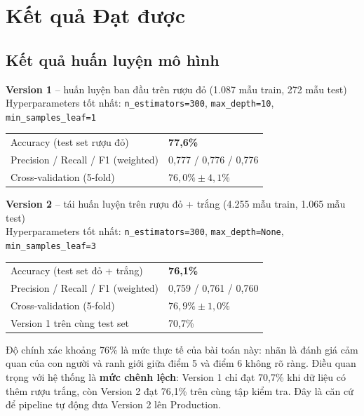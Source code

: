 \documentclass[12pt,a4paper]{report}
\begin{document}
\chapter{Kết quả Đạt được}

\section{Kết quả huấn luyện mô hình}

\begin{resultbox}
\textbf{Version 1} -- huấn luyện ban đầu trên rượu đỏ (1.087 mẫu train, 272 mẫu test)\\
Hyperparameters tốt nhất: \texttt{n\_estimators=300}, \texttt{max\_depth=10}, \texttt{min\_samples\_leaf=1}

\vspace{0.2cm}
\begin{tabular}{ll}
  Accuracy (test set rượu đỏ)   & \textbf{77,6\%} \\
  Precision / Recall / F1 (weighted) & 0,777 / 0,776 / 0,776 \\
  Cross-validation (5-fold)     & $76,0\% \pm 4,1\%$ \\
\end{tabular}

\vspace{0.4cm}
\textbf{Version 2} -- tái huấn luyện trên rượu đỏ + trắng (4.255 mẫu train, 1.065 mẫu test)\\
Hyperparameters tốt nhất: \texttt{n\_estimators=300}, \texttt{max\_depth=None}, \texttt{min\_samples\_leaf=3}

\vspace{0.2cm}
\begin{tabular}{ll}
  Accuracy (test set đỏ + trắng) & \textbf{76,1\%} \\
  Precision / Recall / F1 (weighted) & 0,759 / 0,761 / 0,760 \\
  Cross-validation (5-fold)     & $76,9\% \pm 1,0\%$ \\
  Version 1 trên cùng test set  & 70,7\% \\
\end{tabular}
\end{resultbox}

\begin{notebox}
Độ chính xác khoảng 76\% là mức thực tế của bài toán này: nhãn là đánh giá cảm quan của con người và ranh giới giữa điểm 5 và điểm 6 không rõ ràng. Điều quan trọng với hệ thống là \textbf{mức chênh lệch}: Version 1 chỉ đạt 70,7\% khi dữ liệu có thêm rượu trắng, còn Version 2 đạt 76,1\% trên cùng tập kiểm tra. Đây là căn cứ để pipeline tự động đưa Version 2 lên Production.
\end{notebox}
\end{document}
